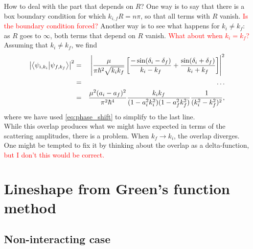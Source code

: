 \documentclass{article}
\theoremstyle{definition}
\newcommand{\f}[2]{\frac{#1}{#2}}
\newcommand{\lb}{\left[}
\newcommand{\rb}{\right]}
\begin{document}
How to deal with the part that depends on $R$? One way is to say that there is a box boundary condition for which $k_{i,f} R = n \pi$, so that all terms with $R$ vanish. \textcolor{red}{Is the boundary condition forced?} Another way is to see what happens for $k_i \neq k_f$: as $R$ goes to $\infty$, both terms that depend on $R$ vanish. \textcolor{red}{What about when $k_i = k_f$?} Assuming that $k_i \neq k_f$, we find 
\begin{eqnarray}
\abs{\bra{\psi_{i,k_i}} \ket{\psi_{f,k_f}} }^2
&=& \abs{ \f{\mu}{\pi \hbar^2 \sqrt{k_ik_f}} \lb \f{-\sin(\delta_i - \delta_f)}{k_i - k_f} + \f{\sin(\delta_i + \delta_f)}{k_i + k_f}\rb }^2 \\
&=& \hdots \\
&=& \f{\mu^2 (a_i - a_f)^2}{\pi^2 \hbar^4}  \f{k_i k_f}{(1 - a_i^2k_i^2) (1 - a_f^2 k_f^2)} \f{1}{(k_i^2 - k_f^2)^2},
\end{eqnarray}
where we have used \eqref{eq:phase_shift} to simplify to the last line. \\

\noindent While this overlap produces what we might have expected in terms of the scattering amplitudes, there is a problem. When $k_f \to k_i$, the overlap diverges. One might be tempted to fix it by thinking about the overlap as a delta-function, \textcolor{red}{but I don't this would be correct.}


\section{Lineshape from Green's function method}


\subsection{Non-interacting case}
\end{document}
